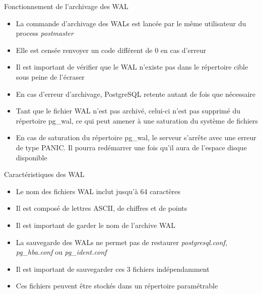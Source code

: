 
\begin{frame}[fragile]{Fonctionnement de l'archivage des WAL}

\begin{itemize}

   \item La commande d'archivage des WALs est lancée par le même utilisateur du process \textit{postmaster}
   \item Elle est censée renvoyer un code différent de 0 en cas d'erreur
   \item Il est important de vérifier que le WAL n'existe pas dans le répertoire cible sous peine de l'écraser
   \item En cas d'erreur d'archivage, PostgreSQL retente autant de fois que nécessaire
   \item Tant que le fichier WAL n'est pas archivé, celui-ci n'est pas supprimé du répertoire pg\_wal, ce qui peut amener à une saturation du système de fichiers
   \item En cas de saturation du répertoire pg\_wal, le serveur s'arrête avec une erreur de type PANIC. Il pourra redémarrer une fois qu'il aura de l'espace disque disponible

\end{itemize}

\end{frame}


\begin{frame}[fragile]{Caractéristiques des WAL}

\begin{itemize}

   \item Le nom des fichiers WAL inclut jusqu'à 64 caractères
   \item Il est composé de lettres ASCII, de chiffres et de points
   \item Il est important de garder le nom de l'archive WAL
   \item La sauvegarde des WALs ne permet pas de restaurer \textit{postgresql.conf}, \textit{pg\_hba.conf} ou \textit{pg\_ident.conf}
   \item Il est important de sauvegarder ces 3 fichiers indépendamment
   \item Ces fichiers peuvent être stockés dans un répertoire paramétrable

\end{itemize}

\end{frame}

